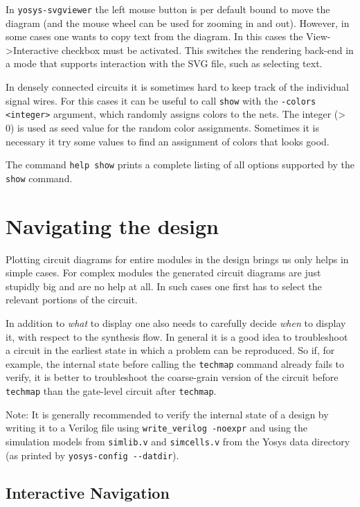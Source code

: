 \documentclass[9pt,technote,a4paper]{IEEEtran}
\begin{document}
In {\tt yosys-svgviewer} the left mouse button is per default bound to move the
diagram (and the mouse wheel can be used for zooming in and out). However, in
some cases one wants to copy text from the diagram. In this cases the
View->Interactive checkbox must be activated. This switches the rendering back-end
in a mode that supports interaction with the SVG file, such as selecting text.

In densely connected circuits it is sometimes hard to keep track of the
individual signal wires. For this cases it can be useful to call {\tt show}
with the {\tt -colors <integer>} argument, which randomly assigns colors to the
nets.  The integer (> 0) is used as seed value for the random color
assignments. Sometimes it is necessary it try some values to find an assignment
of colors that looks good.

The command {\tt help show} prints a complete listing of all options supported
by the {\tt show} command.

\section{Navigating the design}
\label{navigate}

Plotting circuit diagrams for entire modules in the design brings us only helps
in simple cases. For complex modules the generated circuit diagrams are just stupidly big
and are no help at all. In such cases one first has to select the relevant
portions of the circuit.

In addition to {\it what\/} to display one also needs to carefully decide
{\it when\/} to display it, with respect to the synthesis flow. In general
it is a good idea to troubleshoot a circuit in the earliest state in which
a problem can be reproduced. So if, for example, the internal state before calling
the {\tt techmap} command already fails to verify, it is better to troubleshoot 
the coarse-grain version of the circuit before {\tt techmap} than the gate-level
circuit after {\tt techmap}.

\medskip

Note: It is generally recommended to verify the internal state of a design by
writing it to a Verilog file using {\tt write\_verilog -noexpr} and using the
simulation models from {\tt simlib.v} and {\tt simcells.v} from the Yosys data
directory (as printed by {\tt yosys-config -{}-datdir}).

\subsection{Interactive Navigation}
\end{document}
